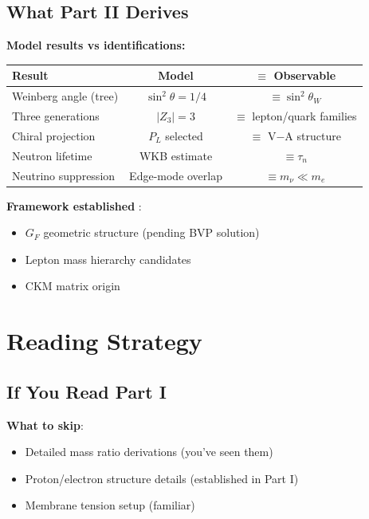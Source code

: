\subsection{What Part II Derives}

\textbf{Model results vs identifications:}
\begin{center}
\small
\begin{tabular}{lcc}
\toprule
\textbf{Result} & \textbf{Model} & \textbf{$\equiv$ Observable} \\
\midrule
Weinberg angle (tree) & $\sin^2\theta = 1/4$ \tagDer{} & $\equiv \sin^2\theta_W$ \tagDcApprox{} \\
Three generations & $|Z_3| = 3$ \tagDer{} & $\equiv$ lepton/quark families \tagDc{} \\
Chiral projection & $P_L$ selected \tagDer{} & $\equiv$ V$-$A structure \tagDc{} \\
Neutron lifetime & WKB estimate \tagDcApprox{} & $\equiv \tau_n$ \tagCal{} \\
Neutrino suppression & Edge-mode overlap \tagDc{} & $\equiv m_\nu \ll m_e$ \tagDc{} \\
\bottomrule
\end{tabular}
\end{center}

\textbf{Framework established} \tagDc:
\begin{itemize}
\item $G_F$ geometric structure (pending BVP solution)
\item Lepton mass hierarchy candidates
\item CKM matrix origin
\end{itemize}

\section{Reading Strategy}
\label{sec:bridge_reading}

\subsection{If You Read Part I}

\textbf{What to skip}:
\begin{itemize}
\item Detailed mass ratio derivations (you've seen them)
\item Proton/electron structure details (established in Part I)
\item Membrane tension setup (familiar)
\end{itemize}

